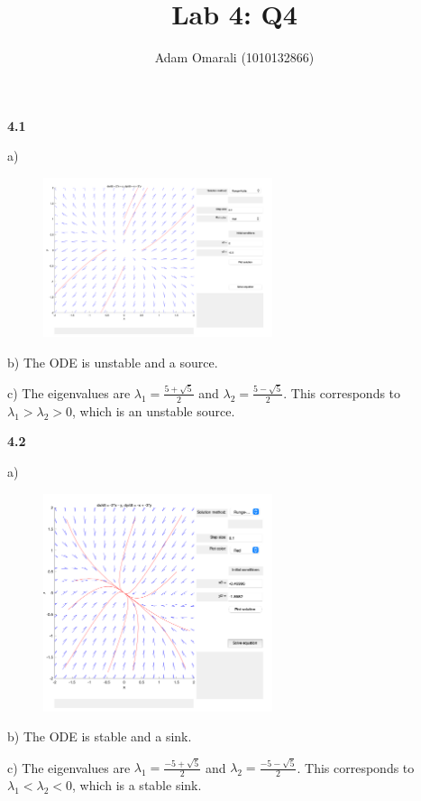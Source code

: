 \documentclass[12pt]{article}
\begin{document}
\title{\bf{Lab 4: Q4}}
\author{Adam Omarali (1010132866)}
\maketitle

\textbf{4.1}

a)
\begin{figure}[H]
    \centering
    \includegraphics[width=0.6\textwidth]{images/4.1.png}
\end{figure}
b) The ODE is unstable and a source.

c) The eigenvalues are $\lambda_1 = \frac{5 + \sqrt 5}{2}$ and $\lambda_2 = \frac{5 - \sqrt 5}{2}$. This corresponds to $\lambda_1 > \lambda_2 > 0$, which is an unstable source.

\textbf{4.2}

a)
\begin{figure}[H]
    \centering
    \includegraphics[width=0.6\textwidth]{images/4.2.png}
\end{figure}

b) The ODE is stable and a sink.

c) The eigenvalues are $\lambda_1 = \frac{-5 + \sqrt 5}{2}$ and $\lambda_2 = \frac{-5 - \sqrt 5}{2}$. This corresponds to $\lambda_1 < \lambda_2 < 0$, which is a stable sink.
\end{document}
